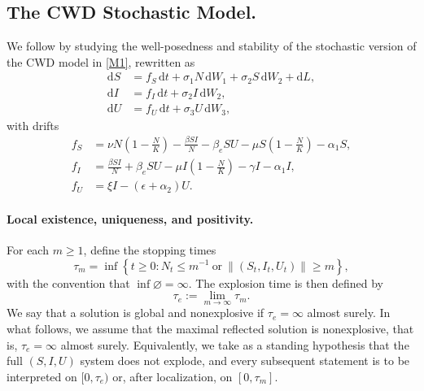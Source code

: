 \documentclass[12pt,a4paper,reqno]{amsart}
\theoremstyle{definition}
\theoremstyle{remark}
\theoremstyle{plain}
\providecommand{\dif}{\mathrm{d}}
\begin{document}
\subsection{The CWD Stochastic Model.} We follow by studying the well-posedness and stability of the stochastic version of the CWD model in \eqref{M1}, rewritten as 
\begin{subequations}\label{eq:reflected}
\begin{align}
\dif S &= f_{S}\,\dif t
        + \sigma_{1} N\,\dif W_{1}
        + \sigma_{2} S\,\dif W_{2}
        + \dif L, \label{eq:reflected-S}\\
\dif I &= f_{I}\,\dif t
        + \sigma_{2} I\,\dif W_{2}, \label{eq:reflected-I}\\
\dif U &= f_{U}\,\dif t
        + \sigma_{3} U\,\dif W_{3}, \label{eq:reflected-U}
\end{align}
\end{subequations}
with drifts
\begin{align*}
f_{S} &= \nu N\left(1-\frac{N}{K}\right)
        - \frac{\beta S I}{N} - \beta_{e} S U
        - \mu S\left(1-\frac{N}{K}\right) - \alpha_{1} S,\\
f_{I} &= \frac{\beta S I}{N} + \beta_{e} S U
        - \mu I\left(1-\frac{N}{K}\right) - \gamma I - \alpha_{1} I,\\
f_{U} &= \xi I - (\epsilon+\alpha_{2}) U.
\end{align*}

\paragraph{\textbf{Local existence, uniqueness, and positivity.}}
For each $m \geq 1$, define the stopping times
$$ \tau_m = \inf\left\{ t \ge 0 : N_t \le m^{-1} \ \text{or}\ \|(S_t, I_t, U_t)\| \ge m \right\}, $$
with the convention that $\inf \varnothing = \infty$. The explosion time is then defined by
$$ \tau_e := \lim_{m \to \infty} \tau_m.$$
We say that a solution is global and nonexplosive if $\tau_e = \infty$ almost surely. In what follows, we assume that the maximal reflected solution is nonexplosive, that is, $\tau_e = \infty$ almost surely. Equivalently, we take as a standing hypothesis that the full $(S,I,U)$ system does not explode, and every subsequent statement is to be interpreted on $[0,\tau_e)$ or, after localization, on $[0,\tau_m]$. 
\end{document}

